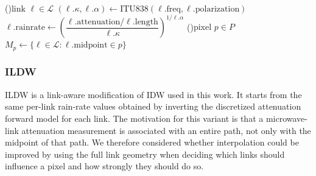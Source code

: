 \documentclass[11pt]{article}
\begin{document}
\smallskip

\begin{algorithm}[H]
    \caption{Discretized IDW. Each link is replaced with a virtual gauge located at the midpoint of the link. The rain rate at the gauge is set to the uniform rain rate that reproduces the input link attenuation under ITU-R P.838-3. IDW is then applied with respect to these virtual gauges. We set the exponent of the decay to $2$. }
    \DontPrintSemicolon
\ForEach(){link $\ell \in \mathcal{L}$}{%
    $(\ell.\kappa,\ell.\alpha) \gets \mathrm{ITU838}(\ell.\mathrm{freq},\ell.\mathrm{polarization})$\;
    $\ell.\mathrm{rainrate} \gets \left(\dfrac{\ell.\mathrm{attenuation}/\ell.\mathrm{length}}{\ell.\kappa}\right)^{1/\ell.\alpha}$\;
}
   \ForEach(){pixel $p \in {P}$}{
        $M_p \gets \{\ell \in \mathcal{L} : \ell.\mathrm{midpoint} \in p\}$\;
    }
\end{algorithm}


\subsubsection{ILDW}
ILDW is a link-aware modification of IDW used in this work. It starts from the same per-link rain-rate values obtained by inverting the discretized attenuation forward model for each link. The motivation for this variant is that a microwave-link attenuation measurement is associated with an entire path, not only with the midpoint of that path. We therefore considered whether interpolation could be improved by using the full link geometry when deciding which links should influence a pixel and how strongly they should do so.
\end{document}
